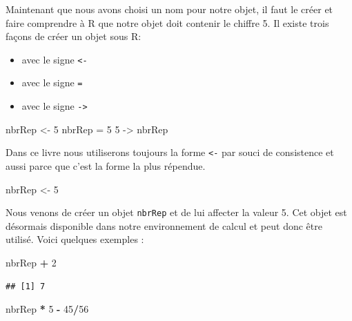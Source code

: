\documentclass[]{book}
\newenvironment{Shaded}{\begin{snugshade}}{\end{snugshade}}
\newcommand{\DecValTok}[1]{\textcolor[rgb]{0.00,0.00,0.81}{#1}}
\newcommand{\StringTok}[1]{\textcolor[rgb]{0.31,0.60,0.02}{#1}}
\newcommand{\OperatorTok}[1]{\textcolor[rgb]{0.81,0.36,0.00}{\textbf{#1}}}
\newcommand{\NormalTok}[1]{#1}
\providecommand{\tightlist}{%
  \setlength{\itemsep}{0pt}\setlength{\parskip}{0pt}}
\begin{document}
Maintenant que nous avons choisi un nom pour notre objet, il faut le
créer et faire comprendre à R que notre objet doit contenir le chiffre
5. Il existe trois façons de créer un objet sous R:

\begin{itemize}
\tightlist
\item
  avec le signe \texttt{\textless{}-}
\item
  avec le signe \texttt{=}
\item
  avec le signe \texttt{-\textgreater{}}
\end{itemize}

\begin{Shaded}
\begin{Highlighting}[]
\NormalTok{nbrRep <-}\StringTok{ }\DecValTok{5}
\NormalTok{nbrRep =}\StringTok{ }\DecValTok{5}
\DecValTok{5}\NormalTok{ ->}\StringTok{ }\NormalTok{nbrRep}
\end{Highlighting}
\end{Shaded}

Dans ce livre nous utiliserons toujours la forme \texttt{\textless{}-}
par souci de consistence et aussi parce que c'est la forme la plus
répendue.

\begin{Shaded}
\begin{Highlighting}[]
\NormalTok{nbrRep <-}\StringTok{ }\DecValTok{5}
\end{Highlighting}
\end{Shaded}

Nous venons de créer un objet \texttt{nbrRep} et de lui affecter la
valeur 5. Cet objet est désormais disponible dans notre environnement de
calcul et peut donc être utilisé. Voici quelques exemples :

\begin{Shaded}
\begin{Highlighting}[]
\NormalTok{nbrRep }\OperatorTok{+}\StringTok{ }\DecValTok{2}
\end{Highlighting}
\end{Shaded}

\begin{verbatim}
## [1] 7
\end{verbatim}

\begin{Shaded}
\begin{Highlighting}[]
\NormalTok{nbrRep }\OperatorTok{*}\StringTok{ }\DecValTok{5} \OperatorTok{-}\StringTok{ }\DecValTok{45}\OperatorTok{/}\DecValTok{56}
\end{Highlighting}
\end{Shaded}
\end{document}
